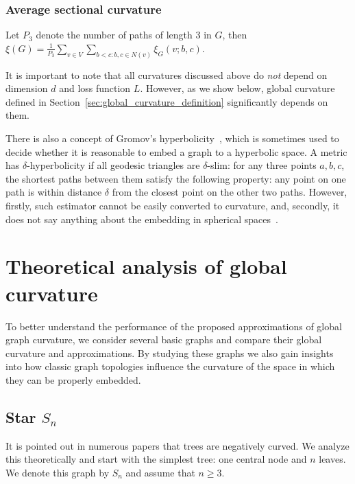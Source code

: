 \documentclass[runningheads]{llncs}
\begin{document}
\subsubsection{Average sectional curvature} Let $P_3$ denote the number of paths of length 3 in $G$, then $\xi(G) = \frac{1}{P_3} \sum\limits_{v \in V }\sum\limits_{b<c: b,c\in N(v)} \xi_G(v;b,c)$.

It is important to note that all curvatures discussed above do \textit{not} depend on dimension $d$ and loss function $L$. However, as we show below, global curvature defined in Section~\ref{sec:global_curvature_definition} significantly depends on them.

There is also a concept of Gromov's hyperbolicity~\cite{gromov1987hyperbolic}, which is sometimes used to decide whether it is reasonable to embed a graph to a hyperbolic space. 
A metric has $\delta$-hyperbolicity if all geodesic triangles are $\delta$-slim: for any three points $a, b, c$, the shortest paths between them satisfy the following property: any point on one path is within distance $\delta$ from the closest point on the other two paths.
However, firstly, such estimator cannot be easily converted to curvature, and, secondly, it does not say anything about the embedding in spherical spaces~\cite{ni2015ricci}.

\section{Theoretical analysis of global curvature}\label{sec:theory}
To better understand the performance of the proposed approximations of global graph curvature,
we consider several basic graphs and compare their global curvature and approximations. 
By studying these graphs we also gain insights into how classic graph topologies influence the curvature of the space in which they can be properly embedded. 


\subsection{Star $S_n$}\label{sec:S_n}

It is pointed out in numerous papers that trees are negatively curved. 
We analyze this theoretically and start with the simplest tree: one central node and $n$ leaves. We denote this graph by $S_n$ and assume that $n \ge 3$.
\end{document}
